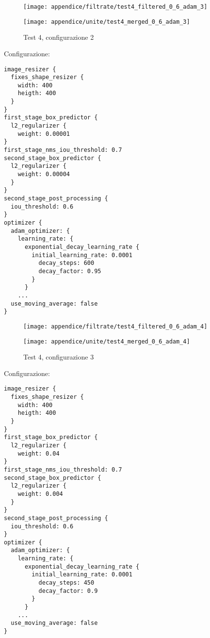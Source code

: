\newpage
\begin{figure}[H]  
    \begin{minipage}{.5\columnwidth}  
        \centering  
        \texttt{[image: appendice/filtrate/test4\_filtered\_0\_6\_adam\_3]}  
    \end{minipage}%
    \begin{minipage}{0.5\columnwidth}  
        \centering  
        \texttt{[image: appendice/unite/test4\_merged\_0\_6\_adam\_3]}  
    \end{minipage}  
    \caption{Test 4, configurazione 2}
\end{figure}%
Configurazione:
\begin{multicols}{2}
    \begin{lstlisting}
image_resizer {
  fixes_shape_resizer {
    width: 400
    heigth: 400
  }
}
first_stage_box_predictor {
  l2_regularizer {
    weight: 0.00001
}
first_stage_nms_iou_threshold: 0.7
second_stage_box_predictor {
  l2_regularizer {
    weight: 0.00004
  }
}
second_stage_post_processing {
  iou_threshold: 0.6
}
optimizer {
  adam_optimizer: {
    learning_rate: {
      exponential_decay_learning_rate {
        initial_learning_rate: 0.0001
          decay_steps: 600
          decay_factor: 0.95
        }
      }
    ...
  use_moving_average: false
}
    \end{lstlisting}
\end{multicols}

\newpage
\begin{figure}[H]  
    \begin{minipage}{.5\columnwidth}  
        \centering  
        \texttt{[image: appendice/filtrate/test4\_filtered\_0\_6\_adam\_4]}  
    \end{minipage}%
    \begin{minipage}{0.5\columnwidth}  
        \centering  
        \texttt{[image: appendice/unite/test4\_merged\_0\_6\_adam\_4]}  
    \end{minipage}  
    \caption{Test 4, configurazione 3}
\end{figure}%
Configurazione:
\begin{multicols}{2}
    \begin{lstlisting}
image_resizer {
  fixes_shape_resizer {
    width: 400
    heigth: 400
  }
}
first_stage_box_predictor {
  l2_regularizer {
    weight: 0.04
}
first_stage_nms_iou_threshold: 0.7
second_stage_box_predictor {
  l2_regularizer {
    weight: 0.004
  }
}
second_stage_post_processing {
  iou_threshold: 0.6
}
optimizer {
  adam_optimizer: {
    learning_rate: {
      exponential_decay_learning_rate {
        initial_learning_rate: 0.0001
          decay_steps: 450
          decay_factor: 0.9
        }
      }
    ...
  use_moving_average: false
}
    \end{lstlisting}
\end{multicols}

